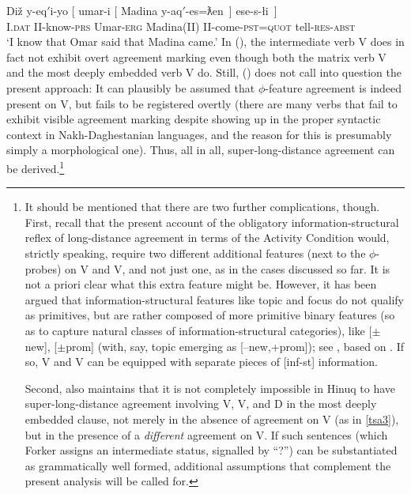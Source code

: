 \documentclass[output=paper
,modfonts
,nonflat]{langsci/langscibook}
\begin{document}
	\ea\label{ex:mueller:36} 
	\gll Di\v{z} \label{tsa3}y-eq$'$i-yo [ \textglotstop umar-i [ Madina  y-aq$'$-es=ƛen~] ese-s-\l i~]\\
	I.{\scshape dat} II-know-{\scshape prs} {} Umar-{\scshape erg} {} Madina(II) II-come-{\scshape pst}={\scshape quot} tell-{\scshape res}-{\scshape abst}\\
	\glt `I know that Omar said that Madina came.'
	\z
	In (\Last), the intermediate verb V does in fact not exhibit overt
	agreement marking even though both the matrix verb V and the most
	deeply embedded verb V do. Still, (\Last) does not call into question
	the present approach: It can plausibly be assumed that $\phi$-feature
	agreement is indeed present on V, but fails to be registered overtly
	(there are many verbs that fail to exhibit visible agreement marking
	despite showing up in the proper syntactic context in
	Nakh-Daghestanian languages, and the reason for this is presumably
	simply a morphological one). Thus, all in all, super-long-distance
	agreement can be derived.\footnote{It should be mentioned that there
		are two further complications, though. First, recall that the
		present account of the obligatory information-structural reflex of
		long-distance agreement in terms of the Activity Condition would,
		strictly speaking, require two different additional features (next
		to the $\phi$-probes) on V and V, and not just one, as in the
		cases discussed so far. It is not a priori clear what
		this extra feature might be. However, it has been argued that
		information-structural features like topic and focus do not qualify
		as primitives, but are rather composed of more primitive binary
		features (so as to capture natural classes of information-structural
		categories), like [$\pm$new], [$\pm$prom] (with, say, topic emerging
		as [--new,+prom]); see \citet{Choi:99}, based on
		\citet{Vallduvi:92}. If so, V and V can be equipped with
		separate pieces of [inf-st] information.
		
		Second, \citet{Forker:11} also maintains that it is not completely
		impossible in Hinuq to have super-long-distance agreement involving
		V, V, and D in the most deeply embedded clause, not merely
		in the absence of agreement on V (as in \ref{tsa3}), but in the presence of a {\it
			different} agreement on V.  If such sentences (which  Forker assigns
		an intermediate status, signalled by ``?'') can be substantiated as
		grammatically well formed, additional assumptions that complement the
		present analysis will be called for.}
	
\end{document}

